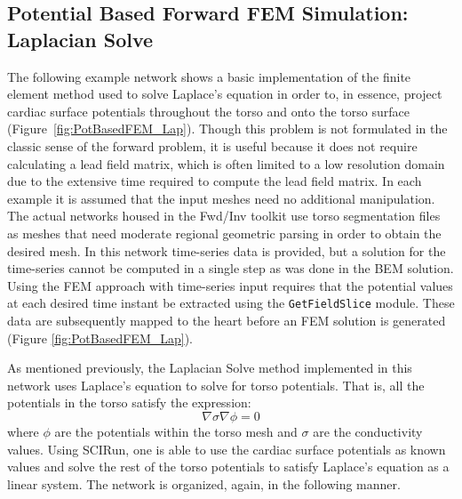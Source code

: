 \subsection{Potential Based Forward FEM Simulation: Laplacian Solve}

The following example network shows a basic implementation of the finite element method used to solve Laplace's equation in order to, in essence, project cardiac surface potentials throughout the torso and onto the torso surface (Figure~\ref{fig:PotBasedFEM_Lap}). 
Though this problem is not formulated in the classic sense of the forward problem, it is useful because it does not require calculating a lead field matrix, which is often limited to a low resolution domain due to the extensive time required to compute the lead field matrix. 
In each example it is assumed that the input meshes need no additional manipulation.  
The actual networks housed in the Fwd/Inv toolkit use torso segmentation files as meshes that need moderate regional geometric parsing in order to obtain the desired mesh. 
In this network time-series data is provided, but a solution for the time-series cannot be computed in a single step as was done in the BEM solution.
Using the FEM approach with time-series input requires that the potential values at each desired time instant be extracted using the {\tt GetFieldSlice} module. 
These data are subsequently mapped to the heart before an FEM solution is generated (Figure \ref{fig:PotBasedFEM_Lap}). 

As mentioned previously, the Laplacian Solve method implemented in this network uses Laplace's equation to solve for torso potentials. That is, all the potentials in the torso satisfy the expression:
\begin{equation*}
\nabla \sigma \nabla \phi = 0
\end{equation*}
\noindent where $\phi$ are the potentials within the torso mesh and $\sigma$ are the conductivity values. Using SCIRun, one is able to use the cardiac surface potentials as known values and solve the rest of the torso potentials to satisfy Laplace's equation as a linear system. 
The network is organized, again, in the following manner.



